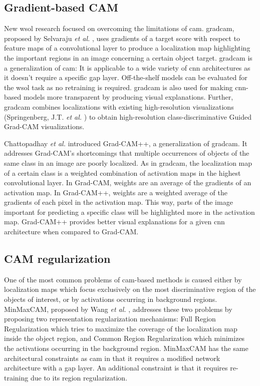 \subsection{Gradient-based CAM}
New \acrshort{wsol} research focused on overcoming the limitations of \acrshort{cam}. \acrfull{gradcam}, proposed by Selvaraju \textit{et al.} \cite{selvaraju2017grad}, uses gradients of a target score with respect to feature maps of a convolutional layer to produce a localization map highlighting the important regions in an image concerning a certain object target. \acrshort{gradcam} is a generalization of \acrshort{cam}: It is applicable to a wide variety of \acrshort{cnn} architectures as it doesn't require a specific \acrshort{gap} layer. Off-the-shelf models can be evaluated for the \acrshort{wsol} task as no retraining is required. \acrshort{gradcam} is also used for making \acrshort{cnn}-based models more transparent by producing visual explanations. Further, \acrshort{gradcam} combines localizations with existing high-resolution visualizations (Springenberg, J.T. \textit{et al.} \cite{springenberg2014striving}) to obtain high-resolution class-discriminative Guided Grad-CAM visualizations.

Chattopadhay \textit{et al.} \cite{chattopadhay2018grad, chattopadhyay2017grad} introduced Grad-CAM++, a generalization of \acrshort{gradcam}. It addresses Grad-CAM's shortcomings that multiple occurrences of objects of the same class in an image are poorly localized. As in \acrshort{gradcam}, the localization map of a certain class is a weighted combination of activation maps in the highest convolutional layer. In Grad-CAM, weights are an average of the gradients of an activation map. In Grad-CAM++, weights are a weighted average of the gradients of each pixel in the activation map. This way, parts of the image important for predicting a specific class will be highlighted more in the activation map. Grad-CAM++ provides better visual explanations for a given \acrshort{cnn} architecture when compared to Grad-CAM.

\subsection{CAM regularization}
One of the most common problems of \acrshort{cam}-based methods is caused either by localization maps which focus exclusively on the most discriminative region of the objects of interest, or by activations occurring in background regions. MinMaxCAM, proposed by Wang \textit{et al.} \cite{wang2021minmaxcam}, addresses these two problems by proposing two representation regularization mechanisms: Full Region Regularization which tries to maximize the coverage of the localization map inside the object region, and Common Region Regularization which minimizes the activations occurring in the background region. MinMaxCAM has the same architectural constraints as \acrshort{cam} in that it requires a modified network architecture with a \acrshort{gap} layer. An additional constraint is that it requires re-training due to its region regularization.

